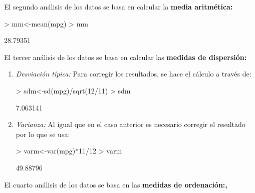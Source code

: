 \documentclass [a4paper] {article}
\begin{document}
\bigskip
El segundo an\'alisis de los datos se basa en calcular la \textbf{media aritm\'etica:}
\begin{Schunk}
\begin{Sinput}
> mm<-mean(mpg)
> mm
\end{Sinput}
\begin{Soutput}
[1] 28.79351
\end{Soutput}
\end{Schunk}

\bigskip
El tercer an\'alisis de los datos se basa en calcular las \textbf{medidas de dispersi\'on:}
\begin{enumerate}
\item
\textit{Desviaci\'on t\'ipica: }Para corregir los resultados, se hace el c\'alculo
a trav\'es de:
\begin{Schunk}
\begin{Sinput}
> sdm<-sd(mpg)/sqrt(12/11)
> sdm
\end{Sinput}
\begin{Soutput}
[1] 7.063141
\end{Soutput}
\end{Schunk}

\item
\textit{Varianza: }Al igual que en el caso anterior es necesario corregir el 
resultado por lo que se usa:
\begin{Schunk}
\begin{Sinput}
> varm<-var(mpg)*11/12
> varm
\end{Sinput}
\begin{Soutput}
[1] 49.88796
\end{Soutput}
\end{Schunk}
\end{enumerate}

\bigskip
El cuarto an\'alisis de los datos se basa en las \textbf{medidas de ordenaci\'on:,}
\bigskip
\end{document}
